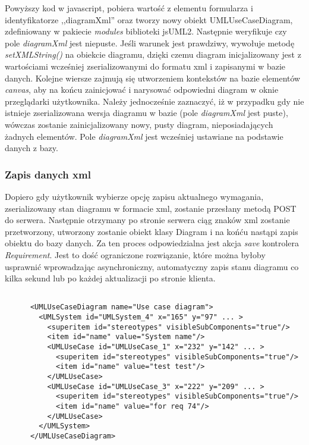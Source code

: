       Powyższy kod w javascript, pobiera wartość z elementu formularza i identyfikatorze ,,diagramXml'' oraz tworzy nowy obiekt UMLUseCaseDiagram, zdefiniowany w pakiecie \emph{modules} biblioteki jsUML2. Następnie weryfikuje czy pole \emph{diagramXml} jest niepuste. Jeśli warunek jest prawdziwy, wywołuje metodę \emph{setXMLString()} na obiekcie diagramu, dzięki czemu diagram inicjalizowany jest z wartościami wcześniej zserializowanymi do formatu xml i zapisanymi w bazie danych. Kolejne wiersze zajmują się utworzeniem kontekstów na bazie elementów \emph{canvas}, aby na końcu zainicjować i narysować odpowiedni diagram w oknie przeglądarki użytkownika. Należy jednocześnie zaznaczyć, iż w przypadku gdy nie istnieje zserializowana wersja diagramu w bazie (pole \emph{diagramXml} jest puste), wówczas zostanie zainicjalizowany nowy, pusty diagram, nieposiadających żadnych elementów. Pole \emph{diagramXml} jest wcześniej ustawiane na podstawie danych z bazy.

      \subsubsection{Zapis danych xml}

      Dopiero gdy użytkownik wybierze opcję zapisu aktualnego wymagania, zserializowany stan diagramu w formacie xml, zostanie przesłany metodą POST do serwera. Następnie otrzymany po stronie serwera ciąg znaków xml zostanie przetworzony, utworzony zostanie obiekt klasy Diagram i na końću nastąpi zapis obiektu do bazy danych. Za ten proces odpowiedzialna jest akcja \emph{save} kontrolera \emph{Requirement}. Jest to dość ograniczone rozwiązanie, które można byłoby usprawnić wprowadzając asynchroniczny, automatyczny zapis stanu diagramu co kilka sekund lub po każdej aktualizacji po stronie klienta.


    \begin{lstlisting}[caption={struktura xml diagramu}, label={lst:diagramXml}]

      <UMLUseCaseDiagram name="Use case diagram">
        <UMLSystem id="UMLSystem_4" x="165" y="97" ... >
          <superitem id="stereotypes" visibleSubComponents="true"/>
          <item id="name" value="System name"/>
          <UMLUseCase id="UMLUseCase_1" x="232" y="142" ... >
            <superitem id="stereotypes" visibleSubComponents="true"/>
            <item id="name" value="test test"/>
          </UMLUseCase>
          <UMLUseCase id="UMLUseCase_3" x="222" y="209" ... >
            <superitem id="stereotypes" visibleSubComponents="true"/>
            <item id="name" value="for req 74"/>
          </UMLUseCase>
        </UMLSystem>
      </UMLUseCaseDiagram>

    \end{lstlisting}

